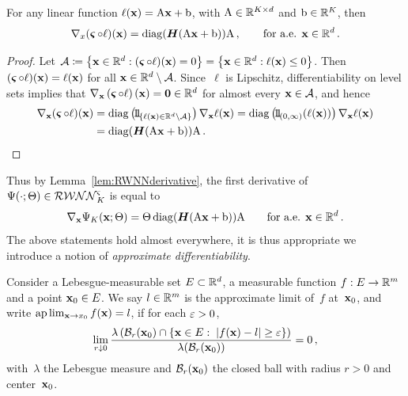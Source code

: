 \begin{lemma}\label{lem:RWNNderivative}
For any linear function $\ell(\mathbf{x})=\mathrm{A} \mathbf{x} + \mathrm{b}$, with $\mathrm{A}\in\mathbb{R}^{K\times d}$ and $\mathrm{b}\in\mathbb{R}^K$, then
\[
\nabla_x(\operatorname{\boldsymbol\varsigma}\circ \ell)(\mathbf{x}) = \operatorname{diag}(\boldsymbol{H}(\mathrm{A} \mathbf{x}+\mathrm{b}))\mathrm{A}\,,
\qquad \text{for a.e. } \mathbf{x}\in\mathbb{R}^d\,.
\]
\end{lemma}
\begin{proof}
Let $\mathcal{A}\coloneqq\left\{\mathbf{x}\in\mathbb{R}^d: (\operatorname{\boldsymbol\varsigma}\circ\ell)(\mathbf{x})=0\right\}
=\left\{\mathbf{x}\in\mathbb{R}^d:\ell(\mathbf{x})\leq 0\right\}$. 
Then ${(\operatorname{\boldsymbol\varsigma}\circ\ell)(\mathbf{x})=\ell(\mathbf{x})}$ for all $\mathbf{x}\in\mathbb{R}^d\setminus\mathcal{A}$.
Since~$\ell$ is Lipschitz,
differentiability on level sets \cite[Section~3.1.2,~Corollary~I]{Evans1992MeasureFunctions} implies that
$\nabla_{\mathbf{x}}\left(\operatorname{\boldsymbol\varsigma}\circ\ell\right)(\mathbf{x}) = \boldsymbol{0}\in\mathbb{R}^d$
for almost every $\mathbf{x}\in\mathcal{A}$,
and hence
\begin{align*}
\nabla_{\xxbf}(\brelu\circ\ell)(\xxbf)
&=\operatorname{diag}\left(\ind_{\{\ell(\xxbf)\in\RR^d\setminus\Aa\}}\right)\nabla_{\xxbf}\ell(\xxbf)=\operatorname{diag}\left(\ind_{(0,\infty)}(\ell(\xxbf))\right)\nabla_{\xxbf}\ell(\xxbf) \\
&=\operatorname{diag}(\Hb(\Am \xxbf+\bm))\Am\,.
\end{align*}
\end{proof}
Thus by Lemma~\ref{lem:RWNNderivative}, the first derivative of $\Psi(\cdot;\Theta)\in\mathcal{RWNN}^{\varsigma}_K$ is equal to 
\begin{equation}\label{eq:RWNN1stderivative}
    \nabla_{\mathbf{x}}\Psi_K(\mathbf{x}; \Theta)
    = \Theta\operatorname{diag}(\boldsymbol{H}(\mathrm{A} \mathbf{x}+\mathrm{b}))\mathrm{A}
    \qquad \text{for a.e. } \mathbf{x}\in\mathbb{R}^d\,.
\end{equation}
The above statements hold almost everywhere, it is thus appropriate we introduce a notion of \textit{approximate differentiability}.
\begin{definition}
Consider a Lebesgue-measurable set $E \subset \mathbb{R}^d$, a measurable function $f: E \rightarrow \mathbb{R}^m$ and a point $\boldsymbol{\mathrm{x}}_0 \in E$. We say $l \in \mathbb{R}^m$ is the approximate limit of~$f$ at~$\boldsymbol{\mathrm{x}}_0$, and write
$\mathrm{ap}\lim_{\mathbf{x} \rightarrow x_0} f(\mathbf{x})=l$,
if for each $\varepsilon>0$,
\[
\lim _{r \downarrow 0} \frac{\lambda\left(\mathcal{B}_r(\boldsymbol{\mathrm{x}}_0) \cap\left\{\mathbf{x}\in E:\;|f(\mathbf{x})-l| \geq \varepsilon\right\}\right)}{\lambda(\mathcal{B}_r(\boldsymbol{\mathrm{x}}_0))}=0\,,
\]
with~$\lambda$ the Lebesgue measure and $\mathcal{B}_r(\boldsymbol{\mathrm{x}}_0)$ the closed ball with radius $r>0$ and center~$\boldsymbol{\mathrm{x}}_0$.
\end{definition}
